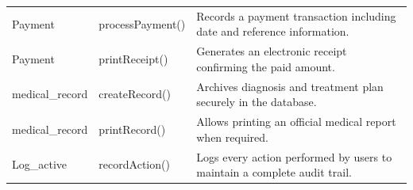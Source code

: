 \begin{table}[H]
\begin{tabularx}{\textwidth}{l l X}
		Payment & processPayment() & Records a payment transaction including date and reference information. \\
		Payment & printReceipt() & Generates an electronic receipt confirming the paid amount. \\
		
		medical\_record & createRecord() & Archives diagnosis and treatment plan securely in the database. \\
		medical\_record & printRecord() & Allows printing an official medical report when required. \\
		
		Log\_active & recordAction() & Logs every action performed by users to maintain a complete audit trail. \\
		
		\bottomrule
	\end{tabularx}
\end{table}